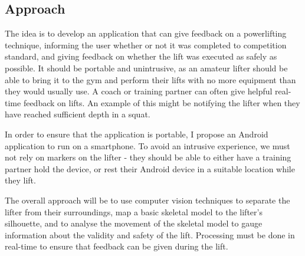 \subsection{Approach}

The idea is to develop an application that can give feedback on a powerlifting technique, informing the user whether or not it was completed to competition standard, and giving feedback on whether the lift was executed as safely as possible. It should be portable and unintrusive, as an amateur lifter should be able to bring it to the gym and perform their lifts with no more equipment than they would usually use. A coach or training partner can often give helpful real-time feedback on lifts. An example of this might be notifying the lifter when they have reached sufficient depth in a squat.

In order to ensure that the application is portable, I propose an Android application to run on a smartphone. To avoid an intrusive experience, we must not rely on markers on the lifter - they should be able to either have a training partner hold the device, or rest their Android device in a suitable location while they lift.

The overall approach will be to use computer vision techniques to separate the lifter from their surroundings, map a basic skeletal model to the lifter's silhouette, and to analyse the movement of the skeletal model to gauge information about the validity and safety of the lift. Processing must be done in real-time to ensure that feedback can be given during the lift.